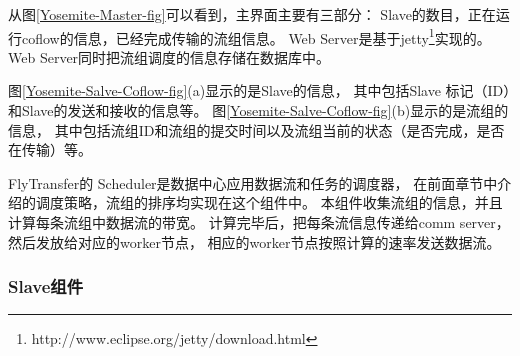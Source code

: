从图\ref{Yosemite-Master-fig}可以看到，主界面主要有三部分：
Slave的数目，正在运行coflow的信息，已经完成传输的流组信息。
Web Server是基于jetty\footnote{http://www.eclipse.org/jetty/download.html}实现的。
Web Server同时把流组调度的信息存储在数据库中。

图\ref{Yosemite-Salve-Coflow-fig}(a)显示的是Slave的信息，
其中包括Slave 标记（ID）和Slave的发送和接收的信息等。
图\ref{Yosemite-Salve-Coflow-fig}(b)显示的是流组的信息，
其中包括流组ID和流组的提交时间以及流组当前的状态（是否完成，是否在传输）等。

FlyTransfer的 Scheduler是数据中心应用数据流和任务的调度器，
在前面章节中介绍的调度策略，流组的排序均实现在这个组件中。
本组件收集流组的信息，并且计算每条流组中数据流的带宽。
计算完毕后，把每条流信息传递给comm server，然后发放给对应的worker节点，
相应的worker节点按照计算的速率发送数据流。


\subsubsection{Slave组件}


